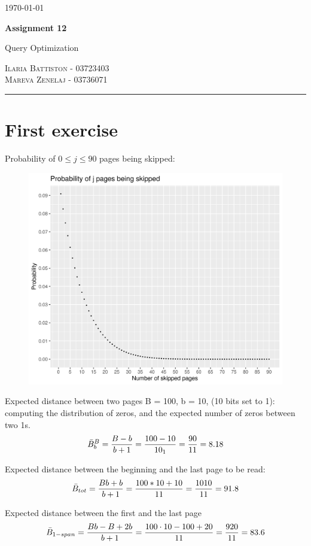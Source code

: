 \documentclass[12pt]{article}
\begin{document}
	\begin{flushright}
		\today
	\end{flushright}
	{\Large \textbf{Assignment 12}}
	
	{\large Query Optimization}
	
	\textsc{Ilaria Battiston - 03723403} \\
	\textsc{Mareva Zenelaj - 03736071}
	
	\rule{\linewidth}{0.5pt}
	
	\section{First exercise}
	Probability of $0 \leq j \leq 90$ pages being skipped:
	\begin{figure}[h]
		\includegraphics[scale=0.7]{plot_skipped.png}
		\centering
	\end{figure}
	    
	Expected distance between two pages B = 100, b = 10, (10 bits set to 1): computing the distribution of zeros, and the expected number of zeros between two 1s.
	$$\Bar{B}_b^B = \frac{B-b}{b+1} = \frac{100-10}{10_1} = \frac{90}{11} = 8.18$$
	    
	Expected distance between the beginning and the last page to be read:
	$$\Bar{B}_{tot} = \frac{Bb +b}{b+1} = \frac{100*10 + 10}{11} = \frac{1010}{11} = 91.8$$
	    
	Expected distance between the first and the last page
	$$\Bar{B}_{1-span} = \frac{Bb-B+2b}{b+1} = \frac{100 \cdot 10-100+20}{11} = \frac{920}{11} =83.6$$
	
\end{document}
